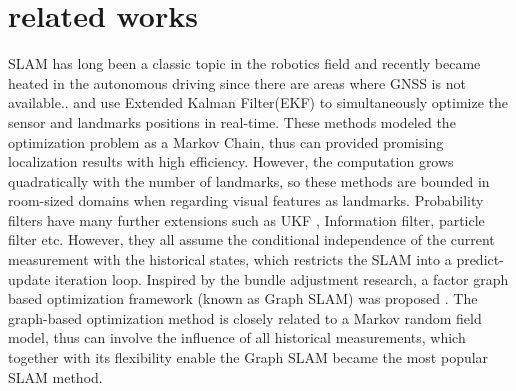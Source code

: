 \documentclass[journal]{IEEEtran}
\begin{document}
\section{related works}
SLAM has long been a classic topic in the robotics field\citep{Cadena:2016fp} and recently became heated in the autonomous driving since there are areas where GNSS is not available.\citep{Bansal2015Analysis}. 
\citet{Davison2003Real} \citet{Davison2007MonoSLAM} and \citet{Civera20101} use Extended Kalman Filter(EKF) to simultaneously optimize the sensor and landmarks positions in real-time. 
These methods modeled the optimization problem as a Markov Chain, thus can provided promising localization results with high efficiency.
However, the computation grows quadratically with the number of landmarks\cite{Bailey2006Simultaneous}, so these methods are bounded in room-sized domains when regarding visual features as landmarks.
Probability filters have many further extensions such as UKF \citep{martinez2005unscented}, Information filter\citep{thrun2005multi}, particle filter\citep{montemerlo2007fastslam}\citep{montemerlo2002fastslam} etc.
However, they all assume the conditional independence of the current measurement with the historical states, which restricts the SLAM into a predict-update iteration loop.
Inspired by the bundle adjustment research\citep{Bundle Ajustment A Modern Synthesis}, a factor graph based optimization framework (known as Graph SLAM) was proposed \citep{Thrun2006The}.
The graph-based optimization method is closely related to a Markov random field model, thus can involve the influence of all historical measurements, which together with its flexibility enable the Graph SLAM became the most popular SLAM method\citep{why filters}.  

\end{document}
